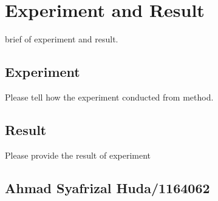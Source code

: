 \chapter{Experiment and Result}
brief of experiment and result.
\section{Experiment}
Please tell how the experiment conducted from method.

\section{Result}
Please provide the result of experiment

\section{Ahmad Syafrizal Huda/1164062}
